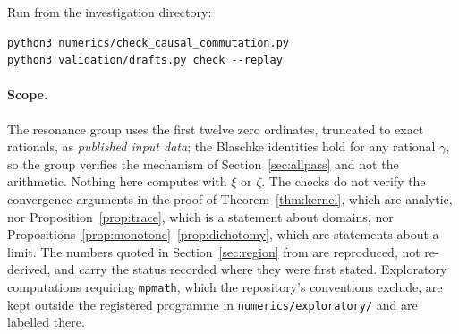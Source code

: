 Run from the investigation directory:
\begin{verbatim}
python3 numerics/check_causal_commutation.py
python3 validation/drafts.py check --replay
\end{verbatim}

\paragraph{Scope.} The resonance group uses the first twelve zero ordinates,
truncated to exact rationals, as \emph{published input data}; the Blaschke
identities hold for any rational $\gamma$, so the group verifies the mechanism of
Section~\ref{sec:allpass} and not the arithmetic. Nothing here computes with
$\xi$ or $\zeta$. The checks do not verify the convergence arguments in the proof
of Theorem~\ref{thm:kernel}, which are analytic, nor
Proposition~\ref{prop:trace}, which is a statement about domains, nor
Propositions~\ref{prop:monotone}--\ref{prop:dichotomy}, which are statements
about a limit. The numbers quoted in Section~\ref{sec:region} from
\cite{CriticalPath} are reproduced, not re-derived, and carry the status recorded
where they were first stated. Exploratory computations requiring \texttt{mpmath},
which the repository's conventions exclude, are kept outside the registered
programme in \texttt{numerics/exploratory/} and are labelled there.
